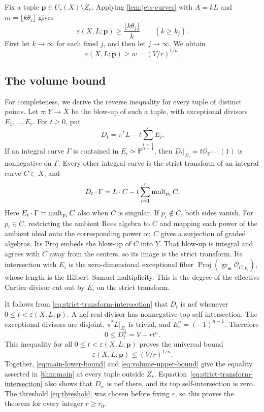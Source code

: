 Fix a tuple $\mathbf{p}\in U_r(X)\setminus Z_r$. Applying \cref{lem:jets-curves} with $A=kL$ and $m=\lfloor k\theta_j\rfloor$ gives
\[
 \varepsilon(X,L;\mathbf{p})\ge\frac{\lfloor k\theta_j\rfloor}{k}
 \qquad(k\ge k_j).
\]
First let $k\to\infty$ for each fixed $j$, and then let $j\to\infty$. We obtain
\begin{equation}
 \label{eq:main-lower-bound}
 \varepsilon(X,L;\mathbf{p})\ge w=(V/r)^{1/n}.
\end{equation}

\subsection{The volume bound}

For completeness, we derive the reverse inequality for every tuple of distinct points. Let $\pi:Y\to X$ be the blow-up of such a tuple, with exceptional divisors $E_1,\ldots,E_r$. For $t\ge0$, put
\[
 D_t=\pi^*L-t\sum_{i=1}^r E_i.
\]
If an integral curve $\Gamma$ is contained in $E_i\simeq\mathbb{P}^{n-1}$, then $D_t|_{E_i}=t\mathcal{O}_{\mathbb{P}^{n-1}}(1)$ is nonnegative on $\Gamma$. Every other integral curve is the strict transform of an integral curve $C\subset X$, and
\begin{equation}
 \label{eq:strict-transform-intersection}
 D_t\cdot\Gamma=L\cdot C-t\sum_{i=1}^r\operatorname{mult}_{p_i}C.
\end{equation}
Here $E_i\cdot\Gamma=\operatorname{mult}_{p_i}C$ also when $C$ is singular. If $p_i\notin C$, both sides vanish. For $p_i\in C$, restricting the ambient Rees algebra to $C$ and mapping each power of the ambient ideal onto the corresponding power on $C$ gives a surjection of graded algebras. Its Proj embeds the blow-up of $C$ into $Y$. That blow-up is integral and agrees with $C$ away from the centers, so its image is the strict transform. Its intersection with $E_i$ is the zero-dimensional exceptional fiber $\operatorname{Proj}(\operatorname{gr}_{\mathfrak{m}}\mathcal{O}_{C,p_i})$, whose length is the Hilbert--Samuel multiplicity. This is the degree of the effective Cartier divisor cut out by $E_i$ on the strict transform.

It follows from \eqref{eq:strict-transform-intersection} that $D_t$ is nef whenever $0\le t<\varepsilon(X,L;\mathbf{p})$. A nef real divisor has nonnegative top self-intersection. The exceptional divisors are disjoint, $\pi^*L|_{E_i}$ is trivial, and $E_i^n=(-1)^{n-1}$. Therefore
\[
 0\le D_t^n=V-rt^n.
\]
This inequality for all $0\le t<\varepsilon(X,L;\mathbf{p})$ proves the universal bound
\begin{equation}
 \label{eq:volume-upper-bound}
 \varepsilon(X,L;\mathbf{p})\le(V/r)^{1/n}.
\end{equation}
Together, \eqref{eq:main-lower-bound} and \eqref{eq:volume-upper-bound} give the equality asserted in \cref{thm:main} at every tuple outside $Z_r$. Equation~\eqref{eq:strict-transform-intersection} also shows that $D_w$ is nef there, and its top self-intersection is zero. The threshold \eqref{eq:threshold} was chosen before fixing $r$, so this proves the theorem for every integer $r\ge r_0$.
